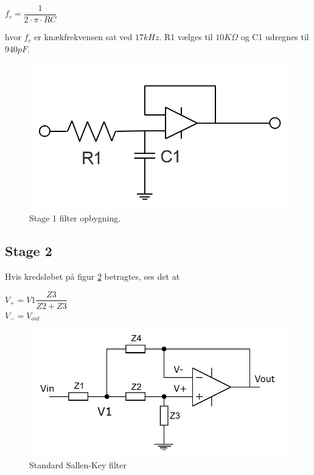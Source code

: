 \begin{center}
	$f_c = \dfrac{1}{2\cdot\pi\cdot R C}$\\
\end{center} 	
hvor $f_c$ er knækfrekvensen sat ved $17kHz$.
R1 vælges til $10K\Omega$ og C1 udregnes til $940pF$.\\
\begin{figure}[h!]
	\centering
	\includegraphics[scale=0.3]{./billeder/stage1}
	\caption{Stage 1 filter opbygning.}
	\label{fig::stage1}
\end{figure}

\subsection{Stage 2}\label{sec::stage2}
Hvis kredsløbet på figur \ref{fig::anfilter_gensallen} betragtes, ses det at\\
\begin{center}
	$V_+ = V1\dfrac{Z3}{Z2+Z3}$\\
	\vspace*{5mm}
	$V_- = V_{out}$
\end{center}

\begin{figure}[h!]
	\centering
	\includegraphics[scale = 0.4]{./billeder/komp_udregn}
	\caption{Standard Sallen-Key filter}
	\label{fig::anfilter_gensallen}
\end{figure}
\FloatBlock

